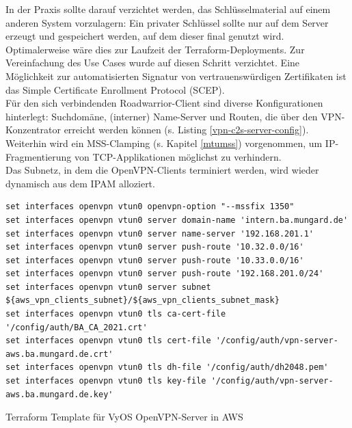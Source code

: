 In der Praxis sollte darauf verzichtet werden, das Schlüsselmaterial \glqq auf einem anderen System vorzulagern\grqq{}: Ein privater Schlüssel sollte nur auf dem Server erzeugt und gespeichert werden, auf dem dieser final genutzt wird. Optimalerweise wäre dies zur Laufzeit der Terraform-\gls{Deployment}s. Zur Vereinfachung des Use Cases wurde auf diesen Schritt verzichtet. Eine Möglichkeit zur automatisierten Signatur von vertrauenswürdigen Zertifikaten ist das Simple Certificate Enrollment Protocol (SCEP)\cite[S.554]{Schmeh2013}.\\
Für den sich verbindenden \gls{Roadwarrior}-\gls{Client} sind diverse Konfigurationen hinterlegt: Suchdomäne, (interner) Name-Server und Routen, die über den \gls{VPN-Konzentrator} erreicht werden können (s. Listing \ref{vpn-c2s-server-config}).
Weiterhin wird ein \gls{MSS}-Clamping (s. Kapitel \ref{mtumss}) vorgenommen, um IP-Fragmen\-tierung von \gls{TCP}-Applikationen möglichst zu verhindern.\\
Das Subnetz, in dem die OpenVPN-\gls{Client}s terminiert werden, wird wieder dynamisch aus dem \gls{IPAM} alloziert.
\begin{listing}[h]
\begin{verbatim}
set interfaces openvpn vtun0 openvpn-option "--mssfix 1350"
set interfaces openvpn vtun0 server domain-name 'intern.ba.mungard.de'
set interfaces openvpn vtun0 server name-server '192.168.201.1'
set interfaces openvpn vtun0 server push-route '10.32.0.0/16'
set interfaces openvpn vtun0 server push-route '10.33.0.0/16'
set interfaces openvpn vtun0 server push-route '192.168.201.0/24'
set interfaces openvpn vtun0 server subnet ${aws_vpn_clients_subnet}/${aws_vpn_clients_subnet_mask}
set interfaces openvpn vtun0 tls ca-cert-file '/config/auth/BA_CA_2021.crt'
set interfaces openvpn vtun0 tls cert-file '/config/auth/vpn-server-aws.ba.mungard.de.crt'
set interfaces openvpn vtun0 tls dh-file '/config/auth/dh2048.pem'
set interfaces openvpn vtun0 tls key-file '/config/auth/vpn-server-aws.ba.mungard.de.key'
\end{verbatim}
\caption{Terraform Template für VyOS OpenVPN-Server in AWS}
\label{vpn-c2s-server-config}
\end{listing}

